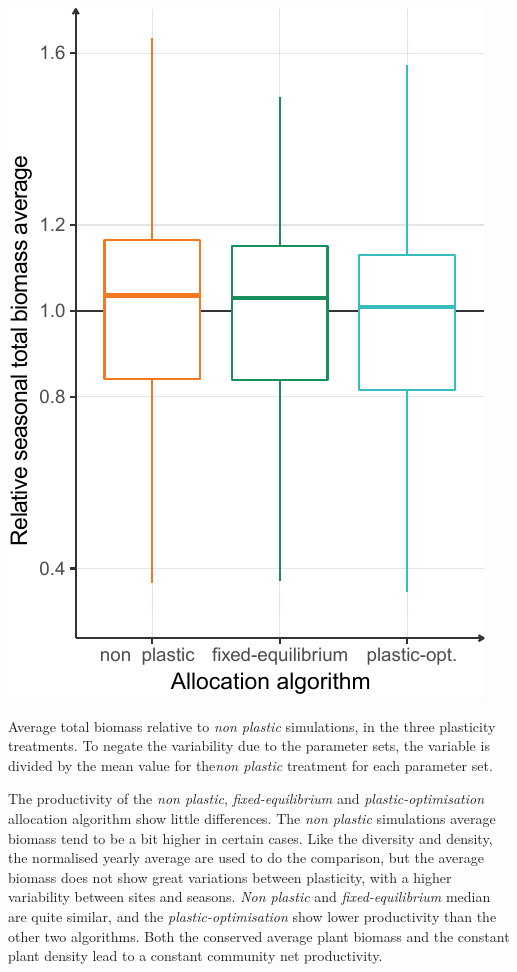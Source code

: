 \begin{marginfigure}\label{fig:total_BM_comm}
\includegraphics[width = \textwidth]{./2_PP/Figures/Comm/comm_BMtot_differences.pdf}
\caption[Average total biomass in plasticity treatments]{Average total biomass relative to \textit{non plastic} simulations, in the three plasticity treatments.  To negate the variability due to the parameter sets, the variable is divided by the mean value for the\textit{non plastic} treatment for each parameter set.}
\end{marginfigure}

The productivity of the \textit{non plastic}, \textit{fixed-equilibrium} and \textit{plastic-optimisation} allocation algorithm show little differences. The \textit{non plastic} simulations average biomass tend to be a bit higher in certain cases. Like the diversity and density, the normalised yearly average are used to do the comparison, but the average biomass does not show great variations between plasticity, with a higher variability between sites and seasons. \textit{Non plastic} and \textit{fixed-equilibrium} median are quite similar, and the \textit{plastic-optimisation} show lower productivity than the other two algorithms. Both the conserved average plant biomass and the constant plant density lead to a constant community net productivity.

